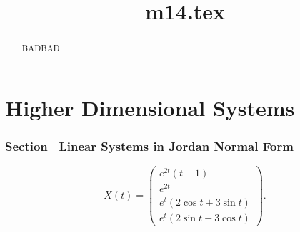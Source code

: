 \documentclass{ximera}
\title{m14.tex}
\begin{document}
\begin{abstract}
BADBAD
\end{abstract}
\maketitle

\chapter{Higher Dimensional Systems}

\subsection*{Section~\protect{\ref{sec:LinHomSys}} Linear Systems in Jordan
Normal Form}

 \ans 
\[
X(t) =
\left(\begin{array}{c}
e^{2t}(t - 1) \\
e^{2t} \\
e^t(2\cos{t} + 3\sin{t}) \\
e^t(2\sin{t} - 3\cos{t})
\end{array}\right).
\]
\end{document}
